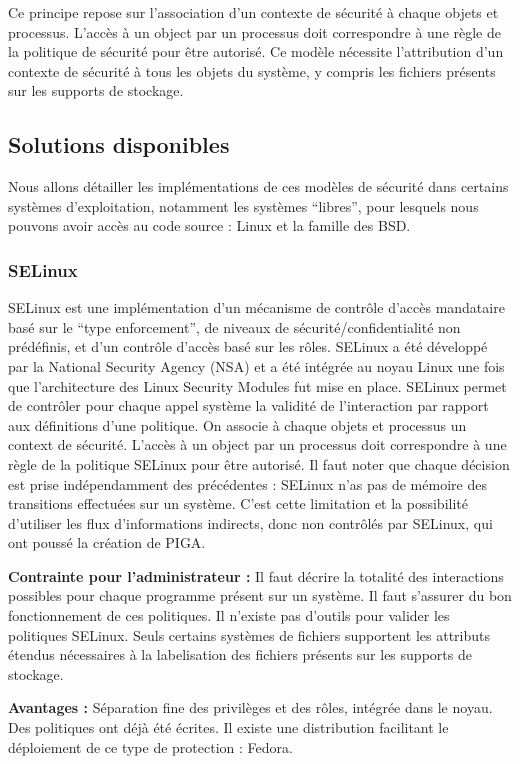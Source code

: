 Ce principe repose sur l'association d'un contexte de sécurité à chaque objets et processus. L'accès à un object par un processus doit correspondre à une règle de la politique de sécurité pour être autorisé. Ce modèle nécessite l'attribution d'un contexte de sécurité à tous les objets du système, y compris les fichiers présents sur les supports de stockage.

\subsection{Solutions disponibles}

Nous allons détailler les implémentations de ces modèles de sécurité dans certains systèmes d'exploitation, notamment les systèmes ``libres'', pour lesquels nous pouvons avoir accès au code source : Linux et la famille des BSD.

\subsubsection{SELinux}

SELinux est une implémentation d'un mécanisme de contrôle d'accès mandataire basé sur le ``type enforcement'', de niveaux de sécurité/confidentialité non prédéfinis, et d'un contrôle d'accès basé sur les rôles. SELinux a été développé par la National Security Agency (NSA) et a été intégrée au noyau Linux une fois que l'architecture des Linux Security Modules fut mise en place. SELinux permet de contrôler pour chaque appel système la validité de l'interaction par rapport aux définitions d'une politique. On associe à chaque objets et processus un context de sécurité. L'accès à un object par un processus doit correspondre à une règle de la politique SELinux pour être autorisé. Il faut noter que chaque décision est prise indépendamment des précédentes : SELinux n'as pas de mémoire des transitions effectuées sur un système. C'est cette limitation et la possibilité d'utiliser les flux d'informations indirects, donc non contrôlés par SELinux, qui ont poussé la création de PIGA.

\begin{list}{}{}
 \item \textbf{Contrainte pour l'administrateur :} Il faut décrire la totalité des interactions possibles pour chaque programme présent sur un système. Il faut s'assurer du bon fonctionnement de ces politiques. Il n'existe pas d'outils pour valider les politiques SELinux. Seuls certains systèmes de fichiers supportent les attributs étendus nécessaires à la labelisation des fichiers présents sur les supports de stockage.
 \item \textbf{Avantages :} Séparation fine des privilèges et des rôles, intégrée dans le noyau. Des politiques ont déjà été écrites. Il existe une distribution facilitant le déploiement de ce type de protection : Fedora.
\end{list}

